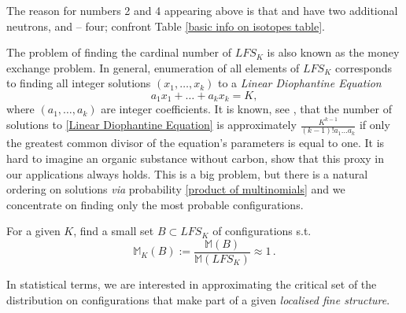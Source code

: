 The reason for numbers 2 and 4 appearing above is that  and  have two additional neutrons, and  -- four; confront Table \ref{basic info on isotopes table}.

The problem of finding the cardinal number of $LFS_K$ is also known as the money exchange problem. In general, enumeration of all elements of $LFS_K$ corresponds to finding all integer solutions $(x_1, \dots, x_k)$ to a {\it Linear Diophantine Equation}  
\begin{equation}\label{Linear Diophantine Equation}
	a_1 x_1 + \dots + a_k x_k = K,
\end{equation}
where $(a_1, \dots, a_k)$ are integer coefficients. It is known, see \cite{Agnarsson2002OnTheSylvesterDenumerants}, that the number of solutions to \eqref{Linear Diophantine Equation} is approximately $\frac{K^{k-1}}{(k-1)! a_1 \dots a_k}$ if only the greatest common divisor of the equation's parameters is equal to one. It is hard to imagine an organic substance without carbon, show that this proxy in our applications always holds. This is a big problem, but there is a natural ordering on solutions {\it via} probability \eqref{product of multinomials} and we concentrate on finding only the most probable configurations. 


\begin{Problem}\label{Problem of finding LFS_K configurations.}
	For a given $K$, find a small set $B \subset LFS_K$ of configurations s.t. 
	\begin{equation}\label{problem equation}
		\mathbb{M}_K (B) := \frac{ \mathbb{M}(B) }{ \mathbb{M}( LFS_K ) } \approx 1\,.	
	\end{equation} 
\end{Problem}


In statistical terms, we are interested in approximating the critical set of the distribution on configurations that make part of a given {\it localised fine structure}. 


